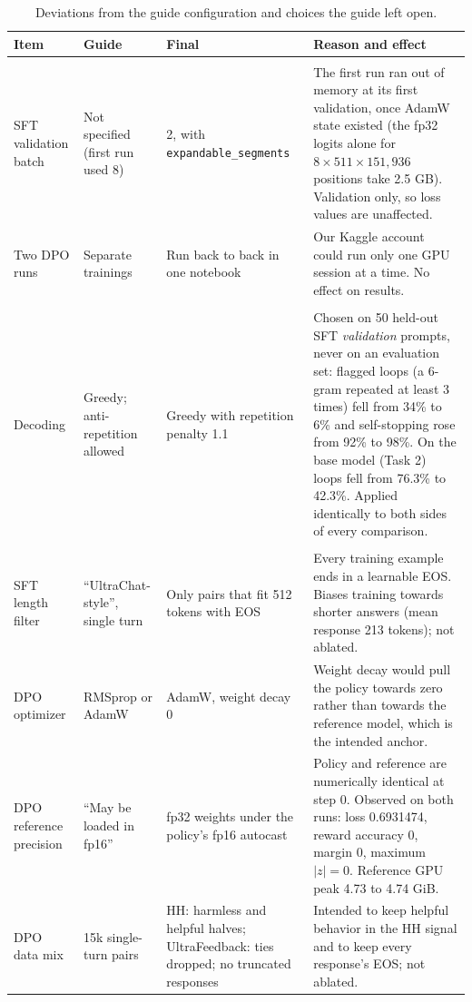 \documentclass[10pt,letterpaper]{article}
\newcommand{\code}[1]{\texttt{#1}}
\begin{document}
\begin{table}[htbp]
\centering\footnotesize
\caption{Deviations from the guide configuration and choices the guide left open.}
\label{tab:deviations}
\begin{tabularx}{\linewidth}{@{}L{2.3cm}L{2.5cm}L{3.0cm}Y@{}}
\toprule
\textbf{Item} & \textbf{Guide} & \textbf{Final} & \textbf{Reason and effect} \\
\midrule
{} \\
SFT validation batch & Not specified (first run used 8) & 2, with \code{expandable\_segments} & The first run ran out of memory at its first validation, once AdamW state existed (the fp32 logits alone for $8\times511\times151{,}936$ positions take 2.5 GB). Validation only, so loss values are unaffected. \\
Two DPO runs & Separate trainings & Run back to back in one notebook & Our Kaggle account could run only one GPU session at a time. No effect on results. \\
 \\
Decoding & Greedy; anti-repetition allowed & Greedy with repetition penalty 1.1 & Chosen on 50 held-out SFT \emph{validation} prompts, never on an evaluation set: flagged loops (a 6-gram repeated at least 3 times) fell from 34\% to 6\% and self-stopping rose from 92\% to 98\%. On the base model (Task 2) loops fell from 76.3\% to 42.3\%. Applied identically to both sides of every comparison. \\
 \\
SFT length filter & ``UltraChat-style'', single turn & Only pairs that fit 512 tokens with EOS & Every training example ends in a learnable EOS. Biases training towards shorter answers (mean response 213 tokens); not ablated. \\
DPO optimizer & RMSprop or AdamW & AdamW, weight decay 0 & Weight decay would pull the policy towards zero rather than towards the reference model, which is the intended anchor. \\
DPO reference precision & ``May be loaded in fp16'' & fp32 weights under the policy's fp16 autocast & Policy and reference are numerically identical at step 0. Observed on both runs: loss 0.6931474, reward accuracy 0, margin 0, maximum $|z|=0$. Reference GPU peak 4.73 to 4.74 GiB. \\
DPO data mix & 15k single-turn pairs & HH: harmless and helpful halves; UltraFeedback: ties dropped; no truncated responses & Intended to keep helpful behavior in the HH signal and to keep every response's EOS; not ablated. \\

\end{tabularx}
\end{table}
\end{document}
